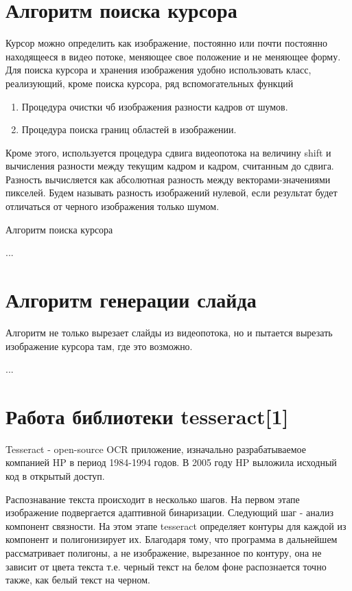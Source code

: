 \documentclass[oneside,final,14pt]{extreport}
\begin{document}
\section{Алгоритм поиска курсора}
Курсор можно определить как изображение, постоянно или почти постоянно находящееся в видео потоке, меняющее свое положение и не меняющее форму. Для поиска курсора и хранения изображения удобно использовать класс, реализующий, кроме поиска курсора, ряд вспомогательных функций

\begin{enumerate}
\item Процедура очистки чб изображения разности кадров от шумов.
\item Процедура поиска границ областей в изображении.
\end{enumerate}

Кроме этого, используется процедура сдвига  видеопотока на величину shift и вычисления разности между текущим кадром и кадром, считанным до сдвига.
Разность вычисляется как абсолютная разность между векторами-значениями пикселей. Будем называть разность изображений нулевой, если результат будет отличаться от черного изображения только шумом.

Алгоритм поиска курсора

...

\section{Алгоритм генерации слайда}
Алгоритм не только вырезает слайды из видеопотока, но и пытается вырезать изображение курсора там, где это возможно.

...

\section{Работа библиотеки tesseract[1]}

Tesseract - open-source OCR приложение, изначально разрабатываемое компанией HP в период 1984-1994 годов. В 2005 году HP выложила исходный код  в открытый доступ. 

Распознавание текста происходит в несколько шагов. На первом этапе изображение подвергается адаптивной бинаризации. Следующий шаг - анализ компонент связности. На этом этапе tesseract определяет контуры для каждой из компонент и полигонизирует их. Благодаря тому, что программа в дальнейшем рассматривает полигоны, а не изображение, вырезанное по контуру, она не зависит от цвета текста т.е. черный текст на белом фоне распознается точно также, как белый текст на черном. 
\end{document}
